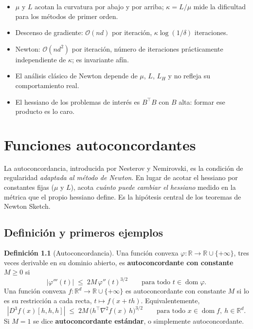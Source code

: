 \documentclass[11pt,a4paper,oneside]{book}
\theoremstyle{definition}
\newtheorem{definicion}[teorema]{Definición}
\theoremstyle{remark}
\newcommand{\R}{\mathbb{R}}
\newcommand{\cO}{\mathcal{O}}
\newcommand{\T}{^{\top}}
\newcommand{\abs}[1]{\left\lvert #1\right\rvert}
\DeclareMathOperator{\dom}{dom}
\newcommand{\LH}{L_{H}}
\begin{document}
\begin{resumen}
\begin{itemize}
  \item $\mu$ y $L$ acotan la curvatura por abajo y por arriba; $\kappa=L/\mu$ mide la dificultad para los métodos de primer orden.
  \item Descenso de gradiente: $\cO(nd)$ por iteración, $\kappa\log(1/\delta)$ iteraciones.
  \item Newton: $\cO(nd^2)$ por iteración, número de iteraciones prácticamente independiente de $\kappa$; es invariante afín.
  \item El análisis clásico de Newton depende de $\mu$, $L$, $\LH$ y no refleja su comportamiento real.
  \item El hessiano de los problemas de interés es $B\T B$ con $B$ alta: formar ese producto es lo caro.
\end{itemize}
\end{resumen}


\chapter{Funciones autoconcordantes}\label{cap:sc}

La autoconcordancia, introducida por Nesterov y Nemirovski, es la condición de regularidad \emph{adaptada al
método de Newton}. En lugar de acotar el hessiano por constantes fijas ($\mu$ y $L$), acota \emph{cuánto
puede cambiar el hessiano} medido en la métrica que el propio hessiano define. Es la hipótesis central de
los teoremas de Newton Sketch.

\section{Definición y primeros ejemplos}

\begin{definicion}[Autoconcordancia]\label{def:sc}
Una función convexa $\varphi:\R\to\R\cup\{+\infty\}$, tres veces derivable en su dominio abierto, es
\textbf{autoconcordante con constante $M\ge0$} si
\begin{equation}\label{eq:sc-1d}
  \abs{\varphi'''(t)}\;\le\;2M\,\varphi''(t)^{3/2}\qquad\text{para todo } t\in\dom\varphi .
\end{equation}
Una función convexa $f:\R^d\to\R\cup\{+\infty\}$ es autoconcordante con constante $M$ si lo es su restricción
a cada recta, $t\mapsto f(x+th)$. Equivalentemente,
\begin{equation}\label{eq:sc-nd}
  \abs{D^3f(x)[h,h,h]}\;\le\;2M\,\bigl(h\T\nabla^2 f(x)\,h\bigr)^{3/2}\qquad\text{para todo } x\in\dom f,\ h\in\R^d .
\end{equation}
Si $M=1$ se dice \textbf{autoconcordante estándar}, o simplemente autoconcordante.
\end{definicion}
\end{document}
